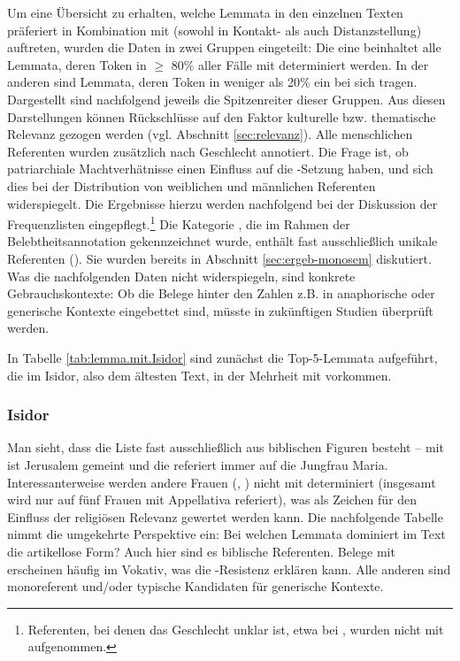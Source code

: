 Um eine Übersicht zu erhalten, welche Lemmata in den einzelnen Texten präferiert in Kombination mit  (sowohl in Kontakt- als auch Distanzstellung) auftreten, wurden die Daten in zwei Gruppen eingeteilt: Die eine beinhaltet alle Lemmata, deren Token in $\geq$ 80\% aller Fälle  mit  determiniert werden. In der anderen sind Lemmata, deren Token in weniger als 20\%  ein  bei sich tragen. Dargestellt sind nachfolgend jeweils die Spitzenreiter dieser Gruppen. Aus diesen Darstellungen können Rückschlüsse auf den Faktor kulturelle bzw. thematische Relevanz gezogen werden (vgl. Abschnitt \ref{sec:relevanz}). Alle menschlichen Referenten wurden zusätzlich nach Geschlecht annotiert. Die Frage ist, ob patriarchiale Machtverhätnisse  einen Einfluss auf die -Setzung haben, und sich dies bei der Distribution von weiblichen und männlichen Referenten widerspiegelt. Die Ergebnisse hierzu werden nachfolgend bei der Diskussion der Frequenzlisten eingepflegt.\footnote{Referenten, bei denen das Geschlecht unklar ist, etwa bei , wurden nicht mit aufgenommen.} Die Kategorie , die im Rahmen der Belebtheitsannotation gekennzeichnet wurde, enthält fast ausschließlich unikale Referenten (). Sie wurden bereits in Abschnitt \ref{sec:ergeb-monosem} diskutiert. Was die nachfolgenden Daten nicht widerspiegeln, sind konkrete Gebrauchskontexte: Ob die Belege hinter den Zahlen z.B. in anaphorische oder generische Kontexte eingebettet sind, müsste in zukünftigen Studien überprüft werden. 

In Tabelle \ref {tab:lemma.mit.Isidor} sind zunächst die Top-5-Lemmata aufgeführt, die im Isidor, also dem ältesten Text, in der Mehrheit mit  vorkommen. 

\subsubsection{Isidor}

Man sieht, dass die Liste fast ausschließlich aus biblischen Figuren besteht -- mit  ist Jerusalem gemeint und die  referiert immer auf die Jungfrau Maria. Interessanterweise werden andere Frauen (, ) nicht mit  determiniert (insgesamt wird nur auf fünf Frauen mit Appellativa referiert), was als Zeichen für den Einfluss der religiösen Relevanz gewertet werden kann. 
Die nachfolgende Tabelle nimmt die umgekehrte Perspektive ein: Bei welchen Lemmata dominiert im Text die artikellose Form? Auch hier sind es biblische Referenten. Belege mit  erscheinen häufig im Vokativ, was die -Resistenz erklären kann. Alle anderen sind monoreferent und/oder typische Kandidaten für generische Kontexte.

